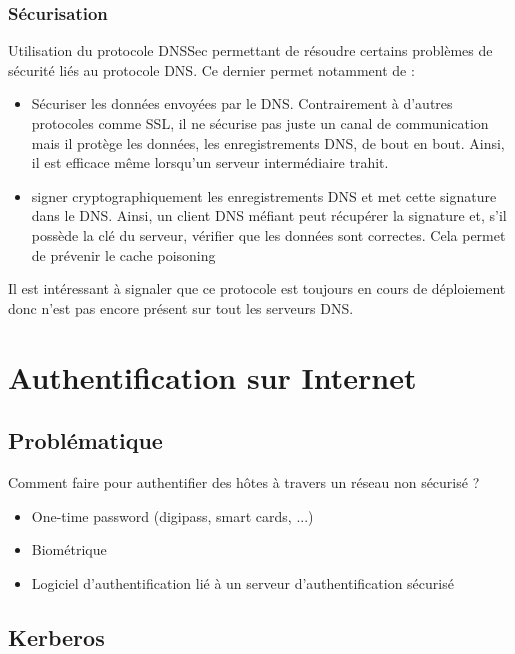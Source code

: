 \documentclass{report}
\begin{document}
\subsubsection{Sécurisation}

Utilisation du protocole DNSSec permettant de résoudre certains problèmes de sécurité liés au protocole DNS. Ce dernier permet notamment de :
\begin{itemize}
    \item Sécuriser les données envoyées par le DNS. Contrairement à d'autres protocoles comme SSL, il ne sécurise pas juste un canal de communication mais il protège les données, les enregistrements DNS, de bout en bout. Ainsi, il est efficace même lorsqu'un serveur intermédiaire trahit.

    \item  signer cryptographiquement les enregistrements DNS et met cette signature dans le DNS. Ainsi, un client DNS méfiant peut récupérer la signature et, s'il possède la clé du serveur, vérifier que les données sont correctes. Cela permet de prévenir le cache poisoning
\end{itemize}

Il est intéressant à signaler que ce protocole est toujours en cours de déploiement donc n'est pas encore présent sur tout les serveurs DNS.

\section{Authentification sur Internet}

\subsection{Problématique}

Comment faire pour authentifier des hôtes à travers un réseau non sécurisé ?

\begin{itemize}
    \item One-time password (digipass, smart cards, ...)
    \item Biométrique
    \item Logiciel d'authentification lié à un serveur d'authentification sécurisé
\end{itemize}

\subsection{Kerberos}
\end{document}

